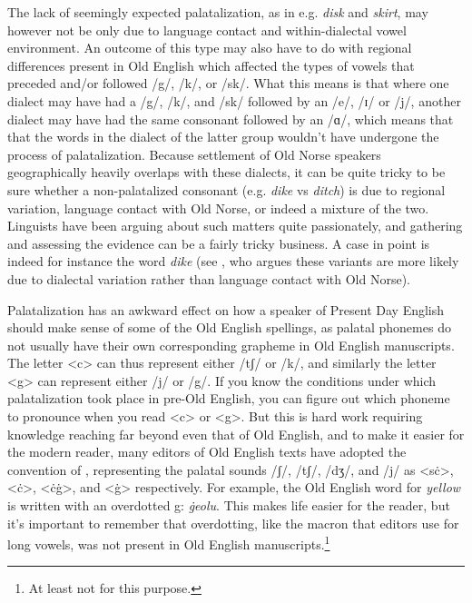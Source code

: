 The lack of seemingly expected palatalization, as in e.g. \textit{disk} and \textit{skirt}, may however not be only due to language contact and within-dialectal vowel environment. An outcome of this type may also have to do with regional differences present in Old English which affected the types of vowels that preceded and/or followed /g/, /k/, or /sk/. What this means is that where one dialect may have had a /g/, /k/, and /sk/ followed by an /e/, /ɪ/ or /j/, another dialect may have had the same consonant followed by an /ɑ/, which means that that the words in the dialect of the latter group wouldn't have undergone the process of palatalization. Because settlement of Old Norse speakers geographically heavily overlaps with these dialects, it can be quite tricky to be sure whether a non-palatalized consonant (e.g. \textit{dike} vs \textit{ditch}) is due to regional variation, language contact with Old Norse, or indeed a mixture of the two. Linguists have been arguing about such matters quite passionately, and gathering and assessing the evidence can be a fairly tricky business. A case in point is indeed for instance the word \textit{dike} (see \citealp{Ramisch1997}, who argues these variants are more likely due to dialectal variation rather than language contact with Old Norse).

Palatalization has an awkward effect on how a speaker of Present Day English should make sense of some of the Old English spellings, as palatal phonemes do not usually have their own corresponding grapheme in Old English manuscripts. The letter <c> can thus represent either /tʃ/ or /k/, and similarly the letter <g> can represent either /j/ or /g/. If you know the conditions under which palatalization took place in pre-Old English, you can figure out which phoneme to pronounce when you read <c> or <g>. But this is hard work requiring knowledge reaching far beyond even that of Old English, and to make it easier for the modern reader, many editors of Old English texts have adopted the convention of , representing the palatal sounds /ʃ/, /tʃ/, /dʒ/, and /j/ as <sċ>, <ċ>, <ċġ>, and <ġ> respectively. For example, the Old English word for \textit{yellow} is written with an overdotted g: \emph{ġeolu}. This makes life easier for the reader, but it's important to remember that overdotting, like the macron that editors use for long vowels, was not present in Old English manuscripts.\footnote{At least not for this purpose.}

